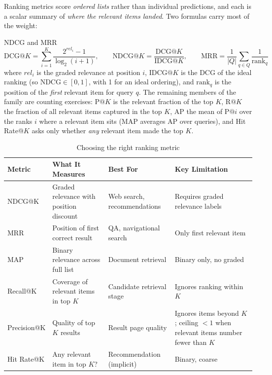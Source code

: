 Ranking metrics score \textit{ordered lists} rather than individual predictions, and each is a scalar summary of \textit{where the relevant items landed}. Two formulas carry most of the weight:

\begin{mathresult}{NDCG and MRR}
\begin{equation}
\text{DCG}@K = \sum_{i=1}^{K} \frac{2^{rel_i} - 1}{\log_2(i+1)},
\qquad
\text{NDCG}@K = \frac{\text{DCG}@K}{\text{IDCG}@K},
\qquad
\text{MRR} = \frac{1}{|Q|}\sum_{q \in Q} \frac{1}{\text{rank}_q}
\end{equation}
where $rel_i$ is the graded relevance at position $i$, $\text{IDCG}@K$ is the DCG of the ideal ranking (so $\text{NDCG} \in [0,1]$, with 1 for an ideal ordering), and $\text{rank}_q$ is the position of the \textit{first} relevant item for query $q$. The remaining members of the family are counting exercises: $\text{P}@K$ is the relevant fraction of the top $K$, $\text{R}@K$ the fraction of all relevant items captured in the top $K$, AP the mean of $\text{P}@i$ over the ranks $i$ where a relevant item sits (MAP averages AP over queries), and Hit Rate@$K$ asks only whether \textit{any} relevant item made the top $K$.
\end{mathresult}

\begin{table}[H]
\centering
\caption{Choosing the right ranking metric}
\begin{tabularx}{\textwidth}{lXXX}
\toprule
\textbf{Metric} & \textbf{What It Measures} & \textbf{Best For} & \textbf{Key Limitation} \\
\midrule
NDCG@K & Graded relevance with position discount & Web search, recommendations & Requires graded relevance labels \\
MRR & Position of first correct result & QA, navigational search & Only first relevant item \\
MAP & Binary relevance across full list & Document retrieval & Binary only, no graded \\
Recall@K & Coverage of relevant items in top $K$ & Candidate retrieval stage & Ignores ranking within $K$ \\
Precision@K & Quality of top $K$ results & Result page quality & Ignores items beyond $K$; ceiling $<1$ when relevant items number fewer than $K$ \\
Hit Rate@K & Any relevant item in top $K$? & Recommendation (implicit) & Binary, coarse \\
\bottomrule
\end{tabularx}
\end{table}

